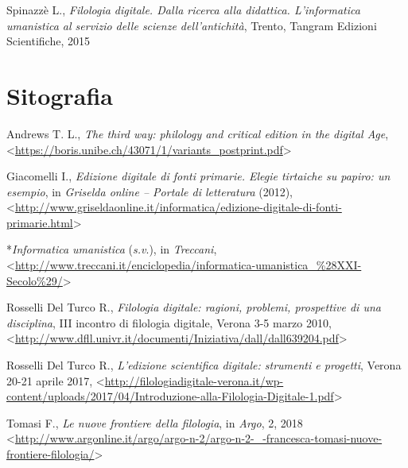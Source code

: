 \documentclass[
  b5paper,
  twoside,
  11pt,
  chapterprefix=false,
  bibliography=totocnumbered,
  listof=flat]{scrbook}
\begin{document}
Spinazzè L., \emph{Filologia digitale. Dalla ricerca alla didattica.
L'informatica umanistica al servizio delle scienze dell'antichità},
Trento, Tangram Edizioni Scientifiche, 2015

\hypertarget{sitografia-12}{%
\section*{Sitografia}\label{sitografia-12}}

Andrews T. L., \emph{The third way: philology and critical edition in the
digital Age},
\textless{}\href{https://boris.unibe.ch/43071/1/variants_postprint.pdf}{{https://boris.unibe.ch/43071/1/variants\_postprint.pdf}}\textgreater~

Giacomelli I., \emph{Edizione digitale di fonti primarie. Elegie tirtaiche su
papiro: un esempio}, in \emph{Griselda online -- Portale di letteratura}
(2012),
\textless{}\href{http://www.griseldaonline.it/informatica/edizione-digitale-di-fonti-primarie.html}{{http://www.griseldaonline.it/informatica/edizione-digitale-di-fonti-primarie.html}}\textgreater{}

*\emph{Informatica umanistica} (\emph{s.v}.), in \emph{Treccani},
\textless{}{\href{http://www.treccani.it/enciclopedia/informatica-umanistica_(XXI-Secolo)/}{http://www.treccani.it/enciclopedia/informatica-umanistica\_\%28XXI-Secolo\%29/}\textgreater{}}

Rosselli Del Turco R., \emph{Filologia digitale: ragioni, problemi,
prospettive di una disciplina}, III incontro di filologia digitale,
Verona 3-5 marzo 2010,
\textless{}\href{http://www.dfll.univr.it/documenti/Iniziativa/dall/dall639204.pdf}{{http://www.dfll.univr.it/documenti/Iniziativa/dall/dall639204.pdf}}\textgreater{}

Rosselli Del Turco R., \emph{L'edizione scientifica digitale: strumenti e
progetti}, Verona 20-21 aprile 2017,
\textless{}\href{http://filologiadigitale-verona.it/wp-content/uploads/2017/04/Introduzione-alla-Filologia-Digitale-1.pdf}{{http://filologiadigitale-verona.it/wp-content/uploads/2017/04/Introduzione-alla-Filologia-Digitale-1.pdf}}\textgreater{}

Tomasi F., \emph{Le nuove frontiere della filologia}, in \emph{Argo}, 2, 2018
\textless{}\href{http://www.argonline.it/argo/argo-n-2/argo-n-2-_-francesca-tomasi-nuove-frontiere-filologia/}{{http://www.argonline.it/argo/argo-n-2/argo-n-2-\_-francesca-tomasi-nuove-frontiere-filologia/}}\textgreater{}
\end{document}
